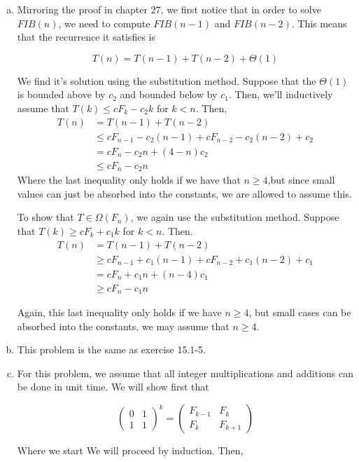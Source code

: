 \documentclass{article}
\begin{document}
\begin{enumerate}[a.]
\item
Mirroring the proof in chapter $27$, we first notice that in order to solve $FIB(n)$, we need to compute $FIB(n-1)$ and $FIB(n-2)$. This means that the recurrence it satisfies is

\[
T(n) = T(n-1) + T(n-2) + \Theta(1)
\]

We find it's solution using the substitution method. Suppose that the $\Theta(1)$ is bounded above by $c_2$ and bounded below by $c_1$. Then, we'll inductively assume that $T(k) \le cF_k - c_2k$ for $k<n$. Then,
\begin{align*}
T(n) &= T(n-1) + T(n-2) \\
&\le cF_{n-1} - c_2(n-1) + cF_{n-2} - c_2(n-2) + c_2\\
&= cF_n -c_2 n + (4 -n) c_2\\
&\le cF_n -c_2 n
\end{align*}
Where the last inequality only holds if we have that $n\ge 4$,but since small values can just be absorbed into the constants, we are allowed to assume this.

To show that $T\in \Omega(F_n)$, we again use the substitution method. Suppose that $T(k) \ge c F_k + c_1 k$ for $k<n$. Then.
\begin{align*}
T(n) &= T(n-1) + T(n-2) \\
&\ge cF_{n-1} + c_1(n-1) + cF_{n-2} + c_1(n-2) + c_1\\
&= cF_n +c_1 n + (n-4) c_1\\
&\ge cF_n -c_1 n
\end{align*}

Again, this last inequality only holds if we have $n\ge 4$, but small cases can be absorbed into the constants, we may assume that $n\ge 4$.

\item
This problem is the same as exercise 15.1-5.
\item
For this problem, we assume that all integer multiplications and additions can be done in unit time. We will show first that

\[
\left( \begin{array}{cc}0&1\\1&1\end{array}\right)^k = \left( \begin{array}{cc}F_{k-1}&F_{k}\\F_{k}&F_{k+1}\end{array}\right)
\]

Where we start We will proceed by induction. Then, 


\end{enumerate}
\end{document}
